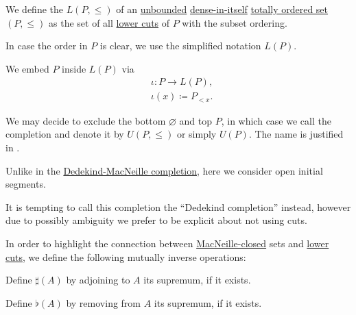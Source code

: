 \begin{definition}\label{def:lower_cut_completion}\mimprovised
  We define the  \( L(P, \leq) \) of an \hyperref[def:extremal_points/bounds]{unbounded} \hyperref[def:dense_total_order]{dense-in-itself} \hyperref[def:totally_ordered_set]{totally ordered set} \( (P, \leq) \) as the set of all \hyperref[def:lower_cut]{lower cuts} of \( P \) with the subset ordering.

  In case the order in \( P \) is clear, we use the simplified notation \( L(P) \).

  We embed \( P \) inside \( L(P) \) via
  \begin{equation*}
    \begin{aligned}
      &\iota: P \to L(P), \\
      &\iota(x) \coloneqq P_{<x}.
    \end{aligned}
  \end{equation*}

  We may decide to exclude the bottom \( \varnothing \) and top \( P \), in which case we call the completion  and denote it by \( U(P, \leq) \) or simply \( U(P) \). The name is justified in .
\end{definition}
\begin{comments}
  \item Unlike in the \hyperref[def:dedekind_macneille_completion]{Dedekind-MacNeille completion}, here we consider open initial segments.
  \item It is tempting to call this completion the \enquote{Dedekind completion} instead, however due to possibly ambiguity we prefer to be explicit about not using cuts.
\end{comments}

\begin{definition}\label{def:lower_cut_closure}\mimprovised
  In order to highlight the connection between \hyperref[def:macnielle_closure]{MacNeille-closed} sets and \hyperref[def:lower_cut]{lower cuts}, we define the following mutually inverse operations:

  \begin{thmenum}
     Define \( \sharp(A) \) by adjoining to \( A \) its supremum, if it exists.

     Define \( \flat(A) \) by removing from \( A \) its supremum, if it exists.
  \end{thmenum}
\end{definition}

